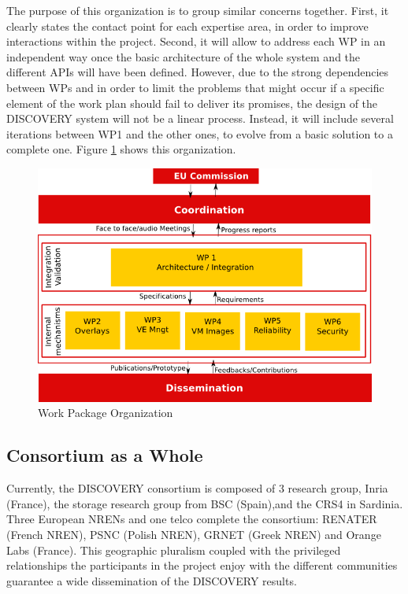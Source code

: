 \documentclass[11pt,a4paper,twoside]{article}
\newcommand{\discovery}{DISCOVERY\xspace}
\begin{document}
The purpose of this organization is to
group similar concerns together. First,
it clearly states the contact point for each expertise area, in order
to improve interactions within the project. Second, it will allow to address each WP
in an independent way once the basic architecture of the whole system and the different
APIs will have been defined. 
However, due to the strong dependencies between WPs and in order to limit the problems
that might occur if a specific element of the work
plan should fail to deliver its promises, the design of the \discovery system
will not be a linear process. Instead, it will include several iterations
between WP1 and the other ones, to evolve from a basic solution to a
complete one.
Figure \ref{fig:wp-org} shows this organization.%

\begin{figure}[htbp]
\begin{center}
 \includegraphics[width=.8\linewidth]{FIGS/pert-4.png}
\caption{Work Package Organization}
\label{fig:wp-org}
\end{center}
\end{figure}

\subsection{Consortium as a Whole}
Currently, the DISCOVERY consortium is composed of 3 research group,  Inria (France), the storage research group from BSC (Spain),and the CRS4 in Sardinia. Three European NRENs and one telco complete the consortium: RENATER (French NREN), PSNC (Polish NREN), GRNET (Greek NREN) and Orange Labs (France). This geographic
pluralism coupled with the privileged relationships the participants in the
project enjoy with the different communities guarantee a wide
dissemination of the \discovery results.
\end{document}
